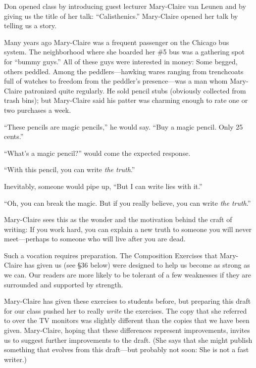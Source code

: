 Don opened class by introducing guest lecturer
Mary-Claire van Leunen and by giving us
the title of her talk: ``Calisthenics.''  Mary-Claire opened her talk by
telling us a story.

Many years ago Mary-Claire was a frequent passenger on the Chicago bus
system.  The neighborhood where she boarded her \#5 bus was a gathering
spot for ``bummy guys.''  All of these guys were interested in money: Some
begged, others peddled.  Among the peddlers---hawking wares ranging from
trenchcoats full of watches to freedom from the peddler's presence---was a
man whom Mary-Claire patronized quite regularly.  
He sold pencil stubs (obviously collected from trash bins); but
Mary-Claire said his  patter was charming enough to rate one or two
purchases a week.

{\narrower\smallskip\noindent
    ``These pencils are magic pencils,'' he would say.  ``Buy a magic pencil.  
    Only 25 cents.''
    
    ``What's a magic pencil?'' would come the expected response.
    
    ``With this pencil, you can write {\it the truth}.''
    
    Inevitably, someone would pipe up, ``But I can write lies with it.''
    
    ``Oh, you can break the magic.  But if you really believe, you can write
   {\it the truth}.''
\smallskip}

Mary-Claire sees this as the wonder and the motivation behind the craft of
writing: If you work hard, you can explain a new truth to someone you
will never meet---perhaps to someone who will live after you are dead. 

Such a vocation requires preparation.  The Composition Exercises that
Mary-Claire has given us (see \S{36} below) were designed to help us become as
strong as we can.  Our readers are more likely to be tolerant of a few
weaknesses if they are surrounded and supported by strength.

Mary-Claire has given these exercises to students before, but preparing
this draft for our class pushed her to really {\it write\/} the exercises.  The
copy that she referred to over the TV monitors was slightly different than
the copies that we have been given.  Mary-Claire, hoping that these
differences represent improvements, invites us to suggest further
improvements to the draft. (She says that she might publish something that
evolves from this draft---but probably not soon: She is not a fast writer.)

